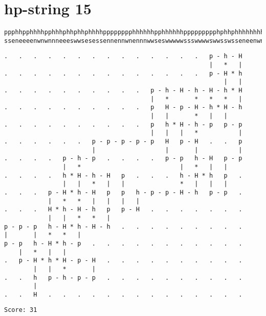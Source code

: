 \documentclass[a4paper,oneside,article,11pt]{memoir}
\begin{document}
\pagebreak

\section*{hp-string 15}
\begin{lstlisting}[basicstyle=\fontsize{6}{11}\ttfamily]
ppphhpphhhhpphhhphhphhphhhhpppppppphhhhhhpphhhhhhppppppppphphhphhhhhhhhhhhpphhhphhphpphphhhpppppphhh
sseneeeenwnwnnneeeswwsesessennennwnennnwwseswwwwwssswwwwswwsswsseneenwneessswwswseeswwwnnwnwwsesess
\end{lstlisting}
\begin{lstlisting}[basicstyle=\fontsize{8}{11}\ttfamily]
.   .   .   .   .   .   .   .   .   .   .   .   .   .   p - h - H  
                                                        |   *   |  
.   .   .   .   .   .   .   .   .   .   .   .   .   .   p - H * h  
                                                            |   |  
.   .   .   .   .   .   .   .   .   .   p - h - H - h - H - h * H  
                                        |   *       *   *   *   |  
.   .   .   .   .   .   .   .   .   .   p   H - p - H - h * H - h  
                                        |   |       *   |   |      
.   .   .   .   .   .   .   .   .   .   p   h * H - h - p   p - p  
                                        |   |   |   *           |  
.   .   .   .   .   .   p - p - p - p - p   H   p - H   .   .   p  
                        |                   |       |           |  
.   .   .   .   p - h - p   .   .   .   .   p - p   h - H   p - p  
                |   *                           |   *   |   |      
.   .   .   .   h * H - h - H   p   .   .   .   h - H * h   p   .  
                |   |   *   |   |               *   |   |   |      
.   .   .   p - H * h - H   p   p   h - p - p - H - h   p - p   .  
            |   *   *   |   |   |   |                              
.   .   .   H * h - H - h   p   p - H   .   .   .   .   .   .   .  
            |   |   *   *   |                                      
p - p - p   h - H * h - H - h   .   .   .   .   .   .   .   .   .  
|       |   *   *   |                                              
p - p   h - H * h - p   .   .   .   .   .   .   .   .   .   .   .  
    |   *   |   |                                                  
.   p - H * h * H - p - H   .   .   .   .   .   .   .   .   .   .  
        |   |   *       |                                          
.   .   h   p - h - p - p   .   .   .   .   .   .   .   .   .   .  
        |                                                          
.   .   H   .   .   .   .   .   .   .   .   .   .   .   .   .   .
\end{lstlisting}
\begin{lstlisting}
Score: 31
\end{lstlisting}
\end{document}
